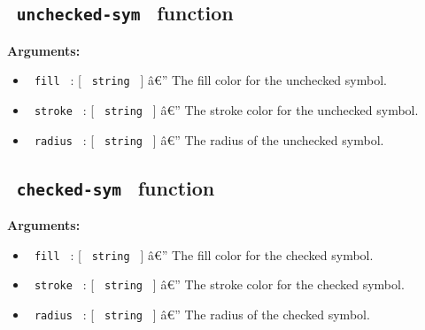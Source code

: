 \subsection{\texorpdfstring{\texttt{\ unchecked-sym\ }
function}{ unchecked-sym  function}}\label{unchecked-sym-function}

\begin{Shaded}
\begin{Highlighting}[]
\end{Highlighting}
\end{Shaded}

\textbf{Arguments:}

\begin{itemize}
\tightlist
\item
  \texttt{\ fill\ } : {[} \texttt{\ string\ } {]} â€'' The fill color
  for the unchecked symbol.
\item
  \texttt{\ stroke\ } : {[} \texttt{\ string\ } {]} â€'' The stroke
  color for the unchecked symbol.
\item
  \texttt{\ radius\ } : {[} \texttt{\ string\ } {]} â€'' The radius of
  the unchecked symbol.
\end{itemize}

\subsection{\texorpdfstring{\texttt{\ checked-sym\ }
function}{ checked-sym  function}}\label{checked-sym-function}

\begin{Shaded}
\begin{Highlighting}[]
\end{Highlighting}
\end{Shaded}

\textbf{Arguments:}

\begin{itemize}
\tightlist
\item
  \texttt{\ fill\ } : {[} \texttt{\ string\ } {]} â€'' The fill color
  for the checked symbol.
\item
  \texttt{\ stroke\ } : {[} \texttt{\ string\ } {]} â€'' The stroke
  color for the checked symbol.
\item
  \texttt{\ radius\ } : {[} \texttt{\ string\ } {]} â€'' The radius of
  the checked symbol.
\end{itemize}

